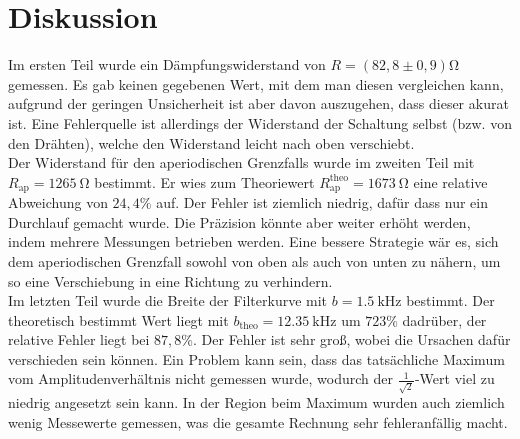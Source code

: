 \section{Diskussion}
\label{sec:Diskussion}
Im ersten Teil wurde ein Dämpfungswiderstand von $R = (82,8 \pm 0,9)\si{\ohm}$ gemessen.
Es gab keinen gegebenen Wert, mit dem man diesen vergleichen kann, aufgrund der geringen
Unsicherheit ist aber davon auszugehen, dass dieser akurat ist. Eine Fehlerquelle ist
allerdings der Widerstand der Schaltung selbst (bzw. von den Drähten), welche den Widerstand leicht
nach oben verschiebt.
\\
Der Widerstand für den aperiodischen Grenzfalls wurde im zweiten Teil mit $R_\text{ap} =
\SI{1265}{\ohm}$ bestimmt. Er wies zum Theoriewert $R_\text{ap}^\text{theo} =
\SI{1673}{\ohm}$ eine relative Abweichung von $24,4\%$ auf. Der Fehler ist ziemlich niedrig,
dafür dass nur ein Durchlauf gemacht wurde. Die Präzision könnte aber weiter erhöht
werden, indem mehrere Messungen betrieben werden. Eine bessere Strategie wär es, sich dem
aperiodischen Grenzfall sowohl von oben als auch von unten zu nähern, um so eine
Verschiebung in eine Richtung zu verhindern.
\\
Im letzten Teil wurde die Breite der Filterkurve mit $b = \SI{1.5}{\kilo\hertz}$ bestimmt.
Der theoretisch bestimmt Wert liegt mit $b_\text{theo} = \SI{12.35}{\kilo\hertz}$ um
$723\%$ dadrüber, der relative Fehler liegt bei $87,8\%$. Der Fehler ist sehr groß, wobei
die Ursachen dafür verschieden sein können. Ein Problem kann sein, dass das
tatsächliche Maximum vom Amplitudenverhältnis nicht gemessen wurde, wodurch der 
$\frac{1}{\sqrt{2}}$-Wert viel zu niedrig angesetzt sein kann. In der Region beim Maximum
wurden auch ziemlich wenig Messewerte gemessen, was die gesamte Rechnung sehr
fehleranfällig macht.

